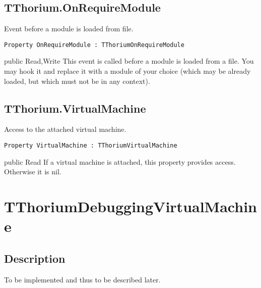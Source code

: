 \subsection{TThorium.OnRequireModule}
\label{thoriumcorepkg:thorium:tthorium:onrequiremodule}
\begin{FPCList}
\Synopsis
Event before a module is loaded from file.\Declaration 

\begin{verbatim}
Property OnRequireModule : TThoriumOnRequireModule
\end{verbatim}
\Visibility
public
\Access
Read,Write
\Description
This event is called before a module is loaded from a file. You may hook it and replace it with a module of your choice (which may be already loaded, but which must not be in any context).\end{FPCList}
\subsection{TThorium.VirtualMachine}
\label{thoriumcorepkg:thorium:tthorium:virtualmachine}
\begin{FPCList}
\Synopsis
Access to the attached virtual machine.\Declaration 

\begin{verbatim}
Property VirtualMachine : TThoriumVirtualMachine
\end{verbatim}
\Visibility
public
\Access
Read
\Description
If a virtual machine is attached, this property provides access. Otherwise it is nil.\end{FPCList}
\section{TThoriumDebuggingVirtualMachine}
\label{thoriumcorepkg:thorium:tthoriumdebuggingvirtualmachine}
\subsection{Description}
To be implemented and thus to be described later.%
